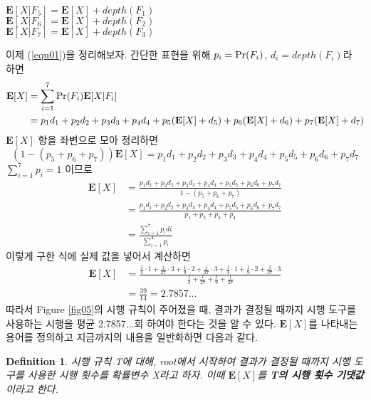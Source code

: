 \documentclass[11pt]{article}
\newtheorem*{definition}{Definition}
\begin{document}
\singlespacing
\begin{center}
$\textbf{E}[X|F_{5}]=\textbf{E}[X]+depth(F_{1})$\\
$\textbf{E}[X|F_{6}]=\textbf{E}[X]+depth(F_{2})$\\
$\textbf{E}[X|F_{7}]=\textbf{E}[X]+depth(F_{3})$\\
\end{center}
\doublespacing

\noindent 이제 (\ref{equ01})을 정리해보자. 간단한 표현을 위해 $p_{i} = \textnormal{Pr}(F_{i})$, $d_{i} = depth(F_{i})$라 하면
\[
\begin{split}
\textbf{E}[X] & = \sum_{i=1}^7 \textnormal{Pr}(F_{i}) \textbf{E}[X|F_{i}]\\
& = p_{1}d_{1} + p_{2}d_{2} + p_{3}d_{3} + p_{4}d_{4} + p_{5}(\textbf{E}[X] + d_{5}) + p_{6}(\textbf{E}[X] + d_{6}) + p_{7}(\textbf{E}[X] + d_{7})
\end{split}
\]
$\textbf{E}[X]$ 항을 좌변으로 모아 정리하면
\[(1 - (p_{5}+p_{6}+p_{7}))\textbf{E}[X] = p_{1}d_{1} + p_{2}d_{2} + p_{3}d_{3} + p_{4}d_{4} + p_{5}d_{5} + p_{6}d_{6} + p_{7}d_{7}\]
\noindent $\displaystyle \sum_{i=1}^7 p_{i} = 1$ 이므로
\[
\begin{split}
\textbf{E}[X] & = \frac{p_{1}d_{1} + p_{2}d_{2} + p_{3}d_{3} + p_{4}d_{4} + p_{5}d_{5} + p_{6}d_{6} + p_{7}d_{7}}{1 - (p_{5}+p_{6}+p_{7})}\\
& = \frac{p_{1}d_{1} + p_{2}d_{2} + p_{3}d_{3} + p_{4}d_{4} + p_{5}d_{5} + p_{6}d_{6} + p_{7}d_{7}}{p_{1}+p_{2}+p_{3}+p_{4}}\\
& = \frac{\displaystyle \sum_{i=1}^{7} p_{i}d{i}}{\displaystyle \sum_{i=1}^{4} p_{i}}
\end{split}
\]
이렇게 구한 식에 실제 값을 넣어서 계산하면
\[
\begin{split}
\textbf{E}[X] & = \frac{\frac{1}{3} \cdot 1 + \frac{1}{27} \cdot 3 + \frac{1}{9} \cdot 2 + \frac{1}{27} \cdot 3 + \frac{1}{3} \cdot 1 + \frac{1}{9} \cdot 2 + \frac{1}{27} \cdot 3}{\frac{1}{3} + \frac{1}{27} + \frac{1}{9} + \frac{1}{27}} \\
& = \frac{39}{14} = 2.7857...
\end{split}
\]
따라서 Figure \ref{fig05}의 시행 규칙이 주어졌을 때, 결과가 결정될 때까지 시행 도구를 사용하는 시행을 평균 2.7857...회 하여야 한다는 것을 알 수 있다. $\textbf{E}[X]$를 나타내는 용어를 정의하고 지금까지의 내용을 일반화하면 다음과 같다.

\singlespacing
\begin{definition}
시행 규칙 T에 대해, root에서 시작하여 결과가 결정될 때까지 시행 도구를 사용한 시행 횟수를 확률변수 X라고 하자. 이때 $\textbf{E}[X]$를 \textbf{T의 시행 횟수 기댓값}이라고 한다.
\end{definition}
\doublespacing
\end{document}
